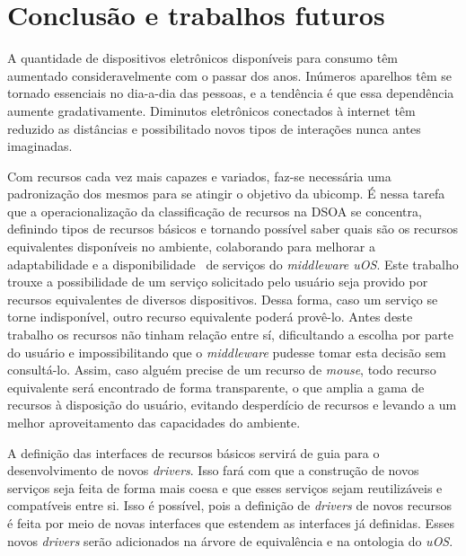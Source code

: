 \chapter{Conclusão e trabalhos futuros}

A quantidade de dispositivos eletrônicos disponíveis para consumo têm aumentado consideravelmente com o passar dos anos. Inúmeros aparelhos têm se tornado essenciais no dia-a-dia das pessoas, e a tendência é que essa dependência aumente gradativamente. Diminutos eletrônicos conectados à internet têm reduzido as distâncias e possibilitado novos tipos de interações nunca antes imaginadas.

\begin{comment}
Atualmente, utilizando um único \emph{smartphone}, é possivel acessar o seu \emph{site} preferido, consultar as ações da bolsa de valores e a previsão do tempo, mudar o canal da sua televisão, ligar a luz do seu quarto, obter rotas urbanas, dentre várias outras tarefas.

É nesse ambiente cada vez mais ubíquo que a classificação de recursos se insere: ambientes com dispositivos heterogêneos (móveis ou não) interagindo entre si, trocando informações ou utilizando capacidades características de cada aparelho.
\end{comment}

Com recursos cada vez mais capazes e variados, faz-se necessária uma padronização dos mesmos para se atingir o objetivo da ubicomp. É nessa tarefa que a operacionalização da classificação de recursos na DSOA se concentra, definindo tipos de recursos básicos e tornando possível saber quais são os recursos equivalentes disponíveis no ambiente, colaborando para melhorar a adaptabilidade e a disponibilidade~\cite{avizienis} de serviços do \emph{middleware uOS}. Este trabalho trouxe a possibilidade de um serviço solicitado pelo usuário seja provido por recursos equivalentes de diversos dispositivos. Dessa forma, caso um serviço se torne indisponível, outro recurso equivalente poderá provê-lo. Antes deste trabalho os recursos não tinham relação entre sí, dificultando a escolha por parte do usuário e impossibilitando que o \emph{middleware} pudesse tomar esta decisão sem consultá-lo. Assim, caso alguém precise de um recurso de \emph{mouse}, todo recurso equivalente será encontrado de forma transparente, o que amplia a gama de recursos à disposição do usuário, evitando desperdício de recursos e levando a um melhor aproveitamento das capacidades do ambiente.

A definição das interfaces de recursos básicos servirá de guia para o desenvolvimento de novos \emph{drivers}. Isso fará com que a construção de novos serviços seja feita de forma mais coesa e que esses serviços sejam reutilizáveis e compatíveis entre si. Isso é possível, pois a definição de \emph{drivers} de novos recursos é feita por meio de novas interfaces que estendem as interfaces já definidas. Esses novos \emph{drivers} serão adicionados na árvore de equivalência e na ontologia do \emph{uOS}.

